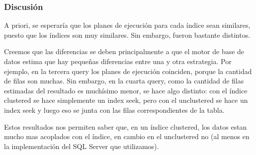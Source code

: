 \subsubsection{Discusión}


A priori, se esperaría que los planes de ejecución para cada índice sean similares, puesto que los índices son muy similares. Sin embargo, fueron bastante distintos.

Creemos que las diferencias se deben principalmente a que el motor de base de datos estima que hay pequeñas diferencias entre una y otra estrategia.  Por ejemplo, en la tercera query los planes de ejecución coinciden, porque la cantidad de filas son muchas.
Sin embargo, en la cuarta query, como la cantidad de filas estimadas del resultado es muchísimo menor, se hace algo distinto: con el índice clustered se hace simplemente un index seek, pero con el unclustered se hace un index seek y luego eso se junta con las filas correspondientes de la tabla.

Estos resultados nos permiten saber que, en un índice clustered, los datos estan mucho mas acoplados con el índice, en cambio en el unclustered no (al menos en la implementación del SQL Server que utilizamos).




